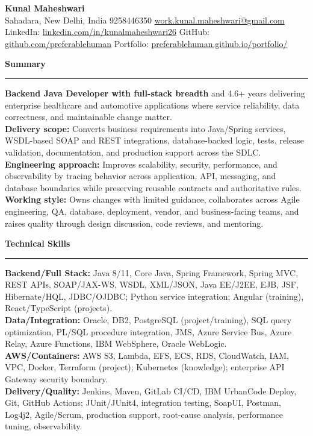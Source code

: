 \documentclass[11pt,letterpaper]{article}
\newcommand{\ressection}[1]{\Needspace{6\baselineskip}\vspace{8pt}\par\textbf{#1}\par\vspace{2pt}\hrule\vspace{5pt}}
\begin{document}
\pagestyle{empty}\raggedright\fontsize{11}{12.5}\selectfont

{\Large \textbf{Kunal Maheshwari}}\\
Sahadara, New Delhi, India \textbar{} 9258446350 \textbar{} \href{mailto:work.kunal.maheshwari@gmail.com}{work.kunal.maheshwari@gmail.com}\\
LinkedIn: \href{https://www.linkedin.com/in/kunalmaheshwari26}{linkedin.com/in/kunalmaheshwari26} \textbar{} GitHub: \href{https://github.com/preferablehuman}{github.com/preferablehuman} \textbar{} Portfolio: \href{https://preferablehuman.github.io/portfolio/}{preferablehuman.github.io/portfolio/}

\ressection{Summary}
\textbf{Backend Java Developer with full-stack breadth} and 4.6+ years delivering enterprise healthcare and automotive applications where service reliability, data correctness, and maintainable change matter.\\[2pt]
\textbf{Delivery scope:} Converts business requirements into Java/Spring services, WSDL-based SOAP and REST integrations, database-backed logic, tests, release validation, documentation, and production support across the SDLC.\\[2pt]
\textbf{Engineering approach:} Improves scalability, security, performance, and observability by tracing behavior across application, API, messaging, and database boundaries while preserving reusable contracts and authoritative rules.\\[2pt]
\textbf{Working style:} Owns changes with limited guidance, collaborates across Agile engineering, QA, database, deployment, vendor, and business-facing teams, and raises quality through design discussion, code reviews, and mentoring.

\ressection{Technical Skills}
\textbf{Backend/Full Stack:} Java 8/11, Core Java, Spring Framework, Spring MVC, REST APIs, SOAP/JAX-WS, WSDL, XML/JSON, Java EE/J2EE, EJB, JSF, Hibernate/HQL, JDBC/OJDBC; Python service integration; Angular (training), React/TypeScript (projects).\\
\textbf{Data/Integration:} Oracle, DB2, PostgreSQL (project/training), SQL query optimization, PL/SQL procedure integration, JMS, Azure Service Bus, Azure Relay, Azure Functions, IBM WebSphere, Oracle WebLogic.\\
\textbf{AWS/Containers:} AWS S3, Lambda, EFS, ECS, RDS, CloudWatch, IAM, VPC, Docker, Terraform (project); Kubernetes (knowledge); enterprise API Gateway security boundary.\\
\textbf{Delivery/Quality:} Jenkins, Maven, GitLab CI/CD, IBM UrbanCode Deploy, Git, GitHub Actions; JUnit/JUnit4, integration testing, SoapUI, Postman, Log4j2, Agile/Scrum, production support, root-cause analysis, performance tuning, observability.
\end{document}
